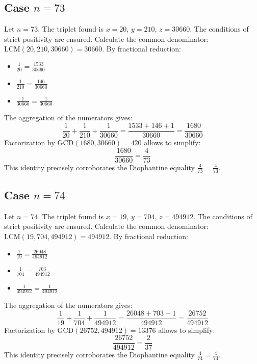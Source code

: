 \documentclass[11pt,a4paper]{article}
\begin{document}
\subsection{Case $n = 73$}
Let $n = 73$. The triplet found is $x = 20$, $y = 210$, $z = 30660$.
The conditions of strict positivity are ensured.
Calculate the common denominator: $\text{LCM}(20, 210, 30660) = 30660$.
By fractional reduction:
\begin{itemize}
    \item $\frac{1}{20} = \frac{1533}{30660}$
    \item $\frac{1}{210} = \frac{146}{30660}$
    \item $\frac{1}{30660} = \frac{1}{30660}$
\end{itemize}
The aggregation of the numerators gives:
$$ \frac{1}{20} + \frac{1}{210} + \frac{1}{30660} = \frac{1533 + 146 + 1}{30660} = \frac{1680}{30660} $$
Factorization by $\text{GCD}(1680, 30660) = 420$ allows to simplify:
$$ \frac{1680}{30660} = \frac{4}{73} $$
This identity precisely corroborates the Diophantine equality $\frac{4}{73} = \frac{4}{73}$.

\subsection{Case $n = 74$}
Let $n = 74$. The triplet found is $x = 19$, $y = 704$, $z = 494912$.
The conditions of strict positivity are ensured.
Calculate the common denominator: $\text{LCM}(19, 704, 494912) = 494912$.
By fractional reduction:
\begin{itemize}
    \item $\frac{1}{19} = \frac{26048}{494912}$
    \item $\frac{1}{704} = \frac{703}{494912}$
    \item $\frac{1}{494912} = \frac{1}{494912}$
\end{itemize}
The aggregation of the numerators gives:
$$ \frac{1}{19} + \frac{1}{704} + \frac{1}{494912} = \frac{26048 + 703 + 1}{494912} = \frac{26752}{494912} $$
Factorization by $\text{GCD}(26752, 494912) = 13376$ allows to simplify:
$$ \frac{26752}{494912} = \frac{2}{37} $$
This identity precisely corroborates the Diophantine equality $\frac{4}{74} = \frac{4}{74}$.
\end{document}
